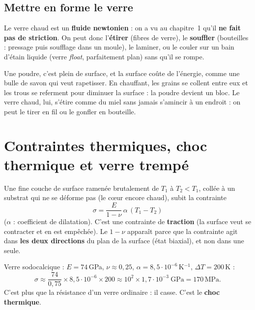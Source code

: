 \subsection*{Mettre en forme le verre}

Le verre chaud est un \textbf{fluide newtonien} : on a vu au chapitre~1 qu'il \textbf{ne fait
pas de striction}. On peut donc l'\textbf{étirer} (fibres de verre), le \textbf{souffler}
(bouteilles : pressage puis soufflage dans un moule), le laminer, ou le couler sur un bain d'étain
liquide (verre \emph{float}, parfaitement plan) sans qu'il se rompe.

\begin{goatbox}
Une poudre, c'est plein de surface, et la surface coûte de l'énergie, comme une bulle de savon
qui veut rapetisser. En chauffant, les grains se collent entre eux et les trous se referment
pour diminuer la surface : la poudre devient un bloc. Le verre chaud, lui, s'étire comme du
miel sans jamais s'amincir à un endroit : on peut le tirer en fil ou le gonfler en bouteille.
\end{goatbox}

\section{Contraintes thermiques, choc thermique et verre trempé}


\begin{thmbox}[title={Contrainte thermique (à connaître par c\oe ur)}]
Une fine couche de surface ramenée brutalement de $T_1$ à $T_2 < T_1$, collée à un substrat qui ne
se déforme pas (le c\oe ur encore chaud), subit la contrainte
\[ \sigma = \frac{E}{1-\nu}\,\alpha\,(T_1 - T_2) \]
($\alpha$ : coefficient de dilatation). C'est une contrainte de \textbf{traction} (la surface
veut se contracter et en est empêchée). Le $1-\nu$ apparaît parce que la contrainte agit dans
\textbf{les deux directions} du plan de la surface (état biaxial), et non dans une seule.
\end{thmbox}

\begin{exbox}[title=Ordre de grandeur (diapositives)]
Verre sodocalcique : $E = 74$\,GPa, $\nu \approx 0{,}25$, $\alpha = 8{,}5\cdot10^{-6}$\,K$^{-1}$,
$\Delta T = 200$\,K :
\[ \sigma \approx \frac{74}{0{,}75}\times8{,}5\cdot10^{-6}\times200
   \approx 10^2 \times 1{,}7\cdot10^{-3}\ \text{GPa} = 170\,\text{MPa}. \]
C'est plus que la résistance d'un verre ordinaire : il casse. C'est le \textbf{choc thermique}.
\end{exbox}

